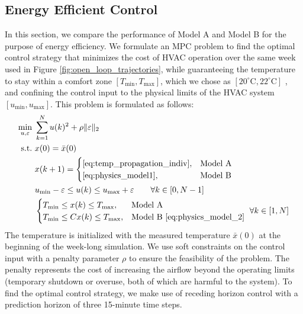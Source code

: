 \subsection{Energy Efficient Control}\label{sec:energy_efficient_control}
In this section, we compare the performance of Model A and Model B for the purpose of energy efficiency. We formulate an MPC problem to find the optimal control strategy that minimizes the cost of HVAC operation over the same week used in Figure \ref{fig:open_loop_trajectories}, while guaranteeing the temperature to stay within a comfort zone $[T_{\text{min}}, T_{\text{max}}]$, which we chose as $[20^\circ \text{C}, 22^\circ \text{C}]$ \cite{Hansen:2013aa}, and confining the control input to the physical limits of the HVAC system $[u_{\text{min}}, u_{\text{max}}]$. This problem is formulated as follows:
\begin{equation}\label{eq:ee_controller}
\begin{split}
\min_{u, \varepsilon}~&\sum_{k=1}^N u(k)^2 + \rho \Vert\varepsilon\Vert_2 \\
\text{s.t.}~& x(0) = \bar{x}(0) \\
& x(k+1) = \begin{cases}
      \eqref{eq:temp_propagation_indiv}, & \text{Model A}  \\
      \eqref{eq:physics_model1}, & \text{Model B}
    \end{cases} \\
& u_{\text{min}}-\varepsilon \leq u(k) \leq u_{\text{max}}+\varepsilon\qquad \forall k\in[0, N-1]\\
& \begin{cases}
      T_{\text{min}} \leq x(k) \leq T_{\text{max}}, & \text{Model A}  \\
      T_{\text{min}} \leq Cx(k) \leq T_{\text{max}}, & \text{Model B}~\eqref{eq:physics_model_2}
    \end{cases}~ \forall k\in[1, N]
\end{split}
\end{equation}
The temperature is initialized with the measured temperature $\bar{x}(0)$ at the beginning of the week-long simulation. We use soft constraints on the control input with a penalty parameter $\rho$ to ensure the feasibility of the problem. The penalty represents the cost of increasing the airflow beyond the operating limits (temporary shutdown or overuse, both of which are harmful to the system). 
To find the optimal control strategy, we make use of receding horizon control with a prediction horizon of three 15-minute time steps.

